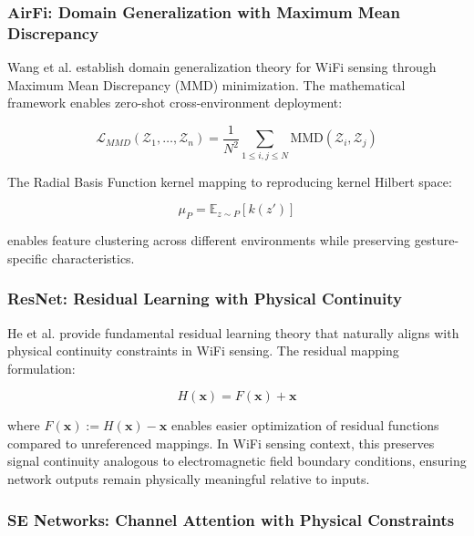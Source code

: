 \documentclass[journal]{IEEEtran}
\begin{document}
\subsubsection{AirFi: Domain Generalization with Maximum Mean Discrepancy}

Wang et al. \cite{wang2022airfi} establish domain generalization theory for WiFi sensing through Maximum Mean Discrepancy (MMD) minimization. The mathematical framework enables zero-shot cross-environment deployment:

\begin{equation}
\mathcal{L}_{MMD}(\mathcal{Z}_1, \ldots, \mathcal{Z}_n) = \frac{1}{N^2} \sum_{1 \leq i,j \leq N} \text{MMD}(\mathcal{Z}_i, \mathcal{Z}_j)
\label{eq:airfi_mmd}
\end{equation}

The Radial Basis Function kernel mapping to reproducing kernel Hilbert space:

\begin{equation}
\mu_P = \mathbb{E}_{z \sim P}[k(z')]
\label{eq:airfi_kernel_mapping}
\end{equation}

enables feature clustering across different environments while preserving gesture-specific characteristics.

\subsubsection{ResNet: Residual Learning with Physical Continuity}

He et al. \cite{he2016deep} provide fundamental residual learning theory that naturally aligns with physical continuity constraints in WiFi sensing. The residual mapping formulation:

\begin{equation}
H(\mathbf{x}) = F(\mathbf{x}) + \mathbf{x}
\label{eq:resnet_residual}
\end{equation}

where $F(\mathbf{x}) := H(\mathbf{x}) - \mathbf{x}$ enables easier optimization of residual functions compared to unreferenced mappings. In WiFi sensing context, this preserves signal continuity analogous to electromagnetic field boundary conditions, ensuring network outputs remain physically meaningful relative to inputs.

\subsubsection{SE Networks: Channel Attention with Physical Constraints}
\end{document}
